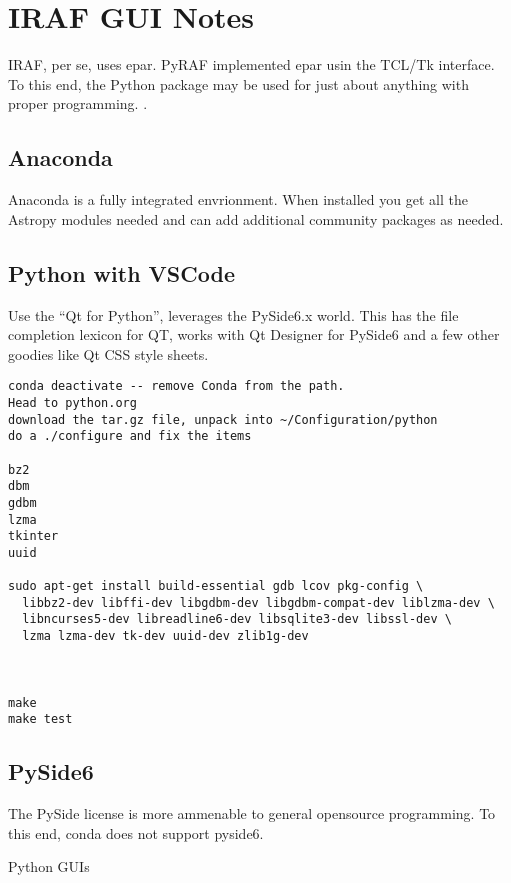 \section{IRAF GUI Notes} \label{sec:IRAFGUINotes}

IRAF, per se, uses epar. PyRAF implemented epar usin the TCL/Tk interface.
To this end, the Python package  may be used for just about
anything with proper programming.  
.

\subsection{Anaconda} \label{sec:PythonAnaconda}

Anaconda is a fully integrated envrionment. When installed you get
all the Astropy modules needed and can add additional community
packages as needed. 

\subsection{Python with VSCode}  \label{sec:PythonWithVSCode}

Use the ``Qt for Python'', leverages the PySide6.x world.
This has the file completion lexicon for QT, works with Qt Designer
for PySide6 and a few other goodies like Qt CSS style sheets.

\begingroup \fontsize{10pt}{10pt}
\selectfont
\begin{verbatim} 
conda deactivate -- remove Conda from the path.
Head to python.org
download the tar.gz file, unpack into ~/Configuration/python
do a ./configure and fix the items

bz2
dbm
gdbm
lzma
tkinter
uuid

sudo apt-get install build-essential gdb lcov pkg-config \
  libbz2-dev libffi-dev libgdbm-dev libgdbm-compat-dev liblzma-dev \
  libncurses5-dev libreadline6-dev libsqlite3-dev libssl-dev \
  lzma lzma-dev tk-dev uuid-dev zlib1g-dev



make 
make test
\end{verbatim}
\endgroup


\subsection{PySide6}

The PySide license is more ammenable to general opensource programming.
To this end, conda does not support pyside6.

Python GUIs



